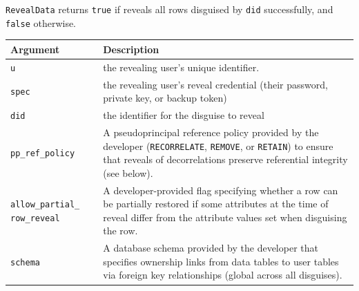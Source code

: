     \texttt{RevealData} returns \texttt{true} if \sys reveals all rows disguised by \texttt{did}
successfully, and \texttt{false} otherwise.

\begin{center}
    \begin{longtable}{|m{}|m{}|}
        \hline
        \textbf{Argument} & \textbf{Description} \\
        \hline
             \texttt{u}& the revealing user's unique identifier. \\
        \hline
        \texttt{spec} & the revealing user's reveal credential (their password, private key, or
    backup token)\\
        \hline
        \texttt{did}& the identifier for the disguise to reveal\\
        \hline
        \texttt{pp\_ref\_policy} & A pseudoprincipal reference policy provided by the developer (\texttt{RECORRELATE}, \texttt{REMOVE},
    or \texttt{RETAIN}) to ensure that reveals of decorrelations preserve
        referential integrity (see below). \\
        \hline
        \texttt{allow\_partial\_} \texttt{row\_reveal}& A developer-provided flag
        specifying whether a row can be partially restored if some attributes at
            the time of reveal differ from the attribute values set when
            disguising the row.\\
        \hline
        \texttt{schema} & A database schema provided by the developer that specifies
    ownership links from data tables to user tables via foreign key
    relationships (global across all disguises).  \\
        \hline
    \end{longtable}
    \end{center}
    \vspace{-12pt}
